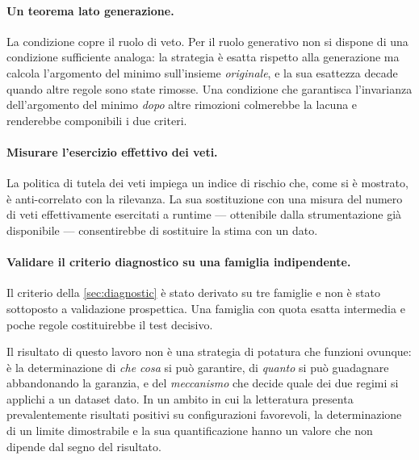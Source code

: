 \paragraph{Un teorema lato generazione.}
La condizione \Vtwo{} copre il ruolo di veto. Per il ruolo generativo non si dispone di una
condizione sufficiente analoga: la strategia  è esatta rispetto alla generazione
ma calcola l'argomento del minimo sull'insieme \emph{originale}, e la sua esattezza decade quando
altre regole sono state rimosse. Una condizione che garantisca l'invarianza dell'argomento del
minimo \emph{dopo} altre rimozioni colmerebbe la lacuna e renderebbe componibili i due criteri.

\paragraph{Misurare l'esercizio effettivo dei veti.}
La politica di tutela dei veti impiega un indice di rischio che, come si è mostrato, è
anti-correlato con la rilevanza. La sua sostituzione con una misura del numero di veti
effettivamente esercitati a runtime --- ottenibile dalla strumentazione già disponibile ---
consentirebbe di sostituire la stima con un dato.

\paragraph{Validare il criterio diagnostico su una famiglia indipendente.}
Il criterio della \autoref{sec:diagnostic} è stato derivato su tre famiglie e non è stato
sottoposto a validazione prospettica. Una famiglia con quota esatta intermedia e poche regole
costituirebbe il test decisivo.

Il risultato di questo lavoro non è una strategia di potatura che funzioni ovunque: è la
determinazione di \emph{che cosa} si può garantire, di \emph{quanto} si può guadagnare
abbandonando la garanzia, e del \emph{meccanismo} che decide quale dei due regimi si applichi a un
dataset dato. In un ambito in cui la letteratura presenta prevalentemente risultati positivi su
configurazioni favorevoli, la determinazione di un limite dimostrabile e la sua quantificazione
hanno un valore che non dipende dal segno del risultato.
